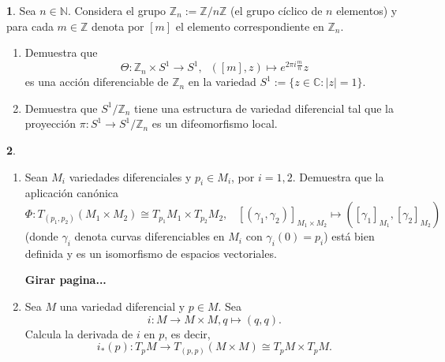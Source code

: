 \documentclass[12pt,a4paper]{report}
\theoremstyle{definition}
\newtheorem{ex}{}
\newcommand{\NN}{\ensuremath{\mathbb N}}
\newcommand{\ZZ}{\ensuremath{\mathbb Z}}
\newcommand{\CC}{\ensuremath{\mathbb C}}
\begin{document}
 \begin{ex}
Sea $n\in \NN$. Considera el grupo $\ZZ_n:=\ZZ/n\ZZ$ (el grupo c\'iclico de $n$ elementos)
y para cada $m\in \ZZ$ denota por $[m]$ el elemento correspondiente en $\ZZ_n$.
\begin{enumerate}
\item
Demuestra que 
$$\Theta \colon \ZZ_n \times S^1 \to S^1,\;\;([m],z)\mapsto e^{2\pi i \frac{m}{n}}z$$
es una acci\'on diferenciable de $\ZZ_n$ en la variedad $S^1:=\{z\in \CC:|z|=1\}$.
\item
 Demuestra que $S^1/\ZZ_n$ tiene una estructura de variedad diferencial tal que la proyecci\'on $\pi \colon S^1 \to S^1/\ZZ_n$ es un difeomorfismo local.
\end{enumerate}
\end{ex}
 
\begin{ex}
\begin{enumerate}
\item Sean $M_i$ variedades diferenciales y $p_i\in M_i$, por $i=1,2$. Demuestra que la aplicaci\'on can\'onica
$$\Phi \colon T_{(p_1,p_2)}(M_1\times M_2)\cong T_{p_1}M_1\times 
T_{p_2}M_2,\;\;\; [(\gamma_1,\gamma_2)]_{M_1\times M_2} \mapsto ([\gamma_1]_{M_1},[\gamma_2]_{M_2})$$
(donde $\gamma_i$ denota curvas diferenciables en $M_i$ con $\gamma_i(0)=p_i$) est\'a bien definida y es un isomorfismo de espacios vectoriales.

\noindent \textbf{Girar pagina...} 

\item Sea $M$ una variedad diferencial y $p\in M$. Sea
$$i \colon M\to M\times M, q\mapsto (q,q).$$
Calcula la derivada de $i$ en $p$, es decir,
$$i_*(p)\colon T_pM \to T_{(p,p)}(M\times M)\cong T_{p}M\times 
T_{p}M.$$
\end{enumerate}
\end{ex}



 
\end{document}
